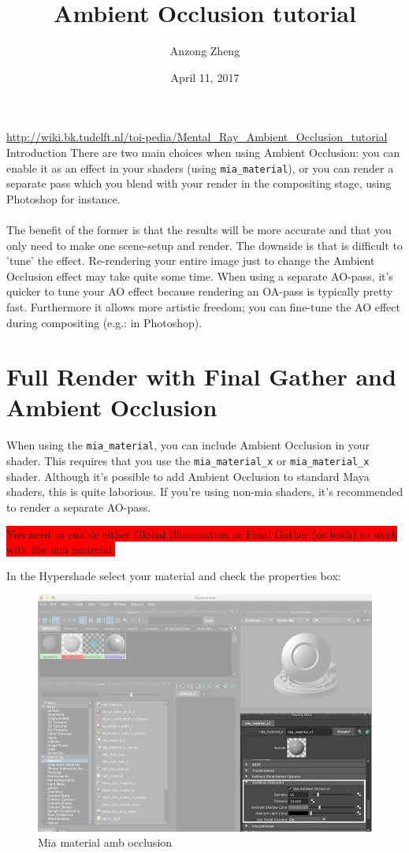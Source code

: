 \documentclass[10pt,a4paper]{article}
\begin{document}
\author{Anzong Zheng}
\title{Ambient Occlusion tutorial}
\date{April 11, 2017}
\maketitle

\tableofcontents

\newpage\clearpage\setcounter{page}{1}

\url{http://wiki.bk.tudelft.nl/toi-pedia/Mental_Ray_Ambient_Occlusion_tutorial}
Introduction
There are two main choices when using Ambient Occlusion: you can enable it as an effect in your shaders (using \lstinline{mia_material}), or you can render a separate pass which you blend with your render in the compositing stage, using Photoshop for instance.
\\
\\
The benefit of the former is that the results will be more accurate and that you only need to make one scene-setup and render. The downside is that is difficult to 'tune' the effect. Re-rendering your entire image just to change the Ambient Occlusion effect may take quite some time. When using a separate AO-pass, it's quicker to tune your AO effect because rendering an OA-pass is typically pretty fast. Furthermore it allows more artistic freedom; you can fine-tune the AO effect during compositing (e.g.: in Photoshop).

\section{Full Render with Final Gather and Ambient Occlusion}
When using the \lstinline{mia_material}, you can include Ambient Occlusion in your shader. This requires that you use the \lstinline{mia_material_x} or \lstinline{mia_material_x} shader. Although it's possible to add Ambient Occlusion to standard Maya shaders, this is quite laborious. If you're using non-mia shaders, it's recommended to render a separate AO-pass.

\colorbox{red}{You need to enable either Global Illumination or Final Gather (or both) to work with the mia material.}

In the Hypershade select your material and check the properties box:

\begin{figure}[htb]
\centering
\includegraphics[width=0.5\linewidth]{figure/Mia_material_amb_occlusion}
\caption{Mia material amb occlusion}
\label{fig:miamaterialambocclusion}
\end{figure}
\end{document}
